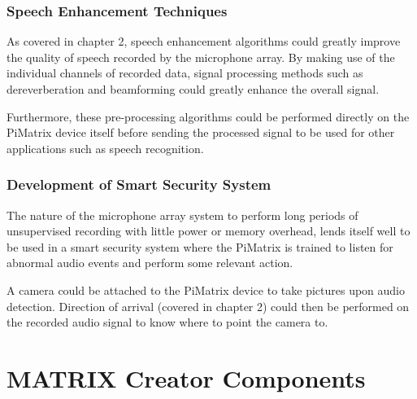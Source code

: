 \documentclass[hidelinks,12pt]{report} %
\begin{document}
\subsection{Speech Enhancement Techniques}

As covered in chapter 2, speech enhancement algorithms could greatly improve the quality of speech recorded by the microphone array. By making use of the individual channels of recorded data, signal processing methods such as dereverberation and beamforming could greatly enhance the overall signal.

Furthermore, these pre-processing algorithms could be performed directly on the PiMatrix device itself before sending the processed signal to be used for other applications such as speech recognition. 

\subsection{Development of Smart Security System}

The nature of the microphone array system to perform long periods of unsupervised recording with little power or memory overhead, lends itself well to be used in a smart security system where the PiMatrix is trained to listen for abnormal audio events and perform some relevant action. 

A camera could be attached to the PiMatrix device to take pictures upon audio detection. Direction of arrival (covered in chapter 2) could then be performed on the recorded audio signal to know where to point the camera to.  



\appendix
{}
\chapter{MATRIX Creator Components}
\end{document}
